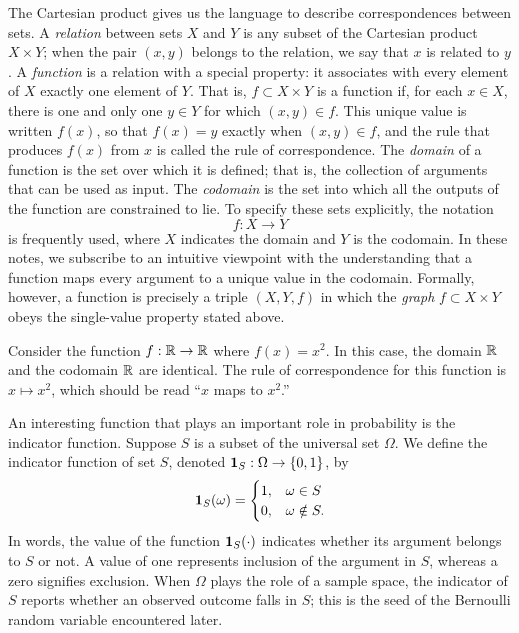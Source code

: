The Cartesian product gives us the language to describe correspondences between sets.
A \emph{relation} between sets $X$ and $Y$ is any subset of the Cartesian product $X \times Y$;
when the pair $(x, y)$ belongs to the relation, we say that $x$ is related to $y$.
A \emph{function} is a relation with a special property: it associates with every element of $X$ exactly one element of $Y$.
That is, $f \subset X \times Y$ is a function if, for each $x \in X$, there is one and only one $y \in Y$ for which $(x, y) \in f$.
This unique value is written $f(x)$, so that $f(x) = y$ exactly when $(x, y) \in f$, and the rule that produces $f(x)$ from $x$ is called the rule of correspondence.
The \emph{domain} of a function is the set over which it is defined; that is, the collection of arguments that can be used as input.
The \emph{codomain} is the set into which all the outputs of the function are constrained to lie.
To specify these sets explicitly, the notation
\begin{equation*}
f: X \rightarrow Y
\end{equation*}
is frequently used, where $X$ indicates the domain and $Y$ is the codomain.
In these notes, we subscribe to an intuitive viewpoint with the understanding that a function maps every argument to a unique value in the codomain.
Formally, however, a function is precisely a triple $(X, Y, f)$ in which the \emph{graph} $f \subset X \times Y$ obeys the single-value property stated above.

\begin{example}
Consider the function $f: \mathbb{R} \rightarrow \mathbb{R}$ where $f(x) = x^2$.
In this case, the domain $\mathbb{R}$ and the codomain $\mathbb{R}$ are identical.
The rule of correspondence for this function is $x \mapsto x^2$, which should be read ``$x$ maps to $x^2$.''
\end{example}

\begin{example}
An interesting function that plays an important role in probability is the indicator function.
Suppose $S$ is a subset of the universal set $\Omega$.
We define the indicator function of set $S$, denoted $\mathbf{1}_S: \Omega \rightarrow \{ 0, 1 \}$, by
\begin{equation*}
\mathbf{1}_S (\omega) = \begin{cases} 1, & \omega \in S\\
0, & \omega \notin S . \end{cases}
\end{equation*}
In words, the value of the function $\mathbf{1}_S (\cdot)$ indicates whether its argument belongs to $S$ or not.
A value of one represents inclusion of the argument in $S$, whereas a zero signifies exclusion.
When $\Omega$ plays the role of a sample space, the indicator of $S$ reports whether an observed outcome falls in $S$; this is the seed of the Bernoulli random variable encountered later.
\end{example}

